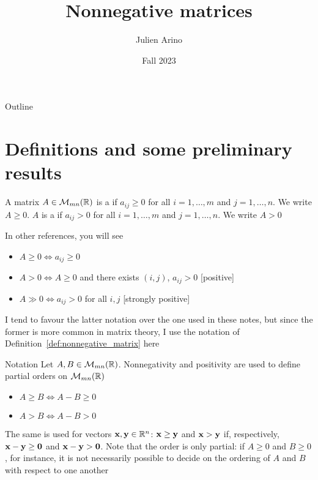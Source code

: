 \documentclass[aspectratio=169]{beamer}
\title{Nonnegative matrices}
\author{Julien Arino}
\date{Fall 2023}
\begin{document}
\begin{frame}
	\titlepage
\end{frame}
\addtocounter{page}{-1}
  
  
\begin{frame}{Outline}
	  \tableofcontents[hideallsubsections]
\end{frame}
\addtocounter{page}{-1}


\section{Definitions and some preliminary results}

\begin{frame}
\begin{definition}
  \label{def:nonnegative_matrix}
A matrix $A\in \mathcal{M}_{mn}(\mathbb{R})$ is a  if $a_{ij}\geq 0$ for all $i=1,\ldots,m$ and $j=1,\ldots,n$. We write $A\geq 0$. $A$ is a  if $a_{ij}>0$ for all $i=1,\ldots,m$ and $j=1,\ldots,n$. We write $A>0$
\end{definition}
\vfill
\begin{remark}
In other references, you will see
\begin{itemize}
    \item $A\geq 0 \iff a_{ij}\geq 0$
    \item $A>0 \iff A\geq 0$ and there exists $(i,j)$, $a_{ij}>0$ 
    \hfill [positive]
    \item $A\gg 0 \iff a_{ij}>0$ for all $i,j$ \hfill [strongly positive]
\end{itemize}
I tend to favour the latter notation over the one used in these notes, but since the former is more common in matrix theory, I use the notation of Definition~\ref{def:nonnegative_matrix} here
\end{remark}
\end{frame}


\begin{frame}{Notation}
Let $A,B\in\mathcal{M}_{mn}(\mathbb{R})$. Nonnegativity and positivity are used to define partial orders on $\mathcal{M}_{mn}(\mathbb{R})$
\begin{itemize}
    \item $A\geq B \iff A-B\geq 0$
    \item $A>B \iff A-B >0$
\end{itemize}
The same is used for vectors $\mathbf{x},\mathbf{y}\in\mathbb{R}^n$: $\mathbf{x}\geq\mathbf{y}$ and $\mathbf{x}>\mathbf{y}$ if, respectively, $\bx-\by\geq\b0$ and $\bx-\by>\b0$. Note that the order is only partial: if $A\geq 0$ and $B\geq 0$, for instance, it is not necessarily possible to decide on the ordering of $A$ and $B$ with respect to one another
\end{frame}
\end{document}

